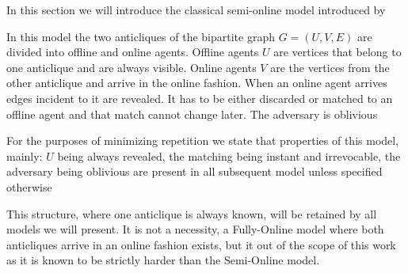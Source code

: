\label{section:classical}
In this section we will introduce the classical semi-online model introduced by \cite{karp}

\begin{definition}
	In this model the two anticliques of the bipartite graph $G=(U,V,E)$ are divided into offline and online agents.
	Offline agents $U$ are vertices that belong to one anticlique and are always visible.
	Online agents $V$ are the vertices from the other anticlique and arrive in the online fashion.
	When an online agent arrives edges incident to it are revealed. It has to be either discarded or matched to an offline agent and that match cannot change later.
	The adversary is oblivious
\end{definition}
For the purposes of minimizing repetition we state that properties of this model, mainly: $U$ being always revealed, the matching being instant and irrevocable, the adversary being oblivious are present in all subsequent model unless specified otherwise

This structure, where one anticlique is always known, will be retained by all models we will present. It is not a necessity, a Fully-Online model where both anticliques arrive in an online fashion exists, but it out of the scope of this work as it is known to be strictly harder than the Semi-Online model.


